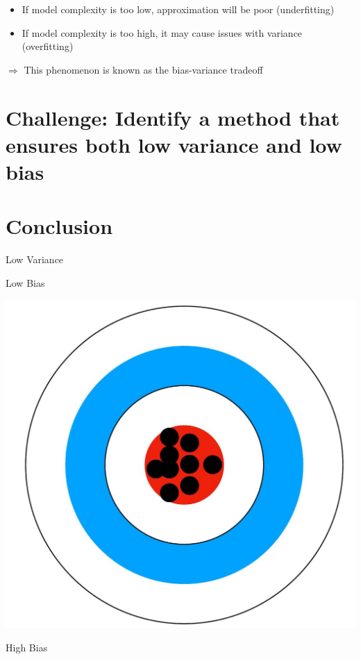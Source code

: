 \documentclass[10pt]{article}
\begin{document}
\begin{itemize}
  \item If model complexity is too low, approximation will be poor (underfitting)

  \item If model complexity is too high, it may cause issues with variance (overfitting)

\end{itemize}

$\Rightarrow$ This phenomenon is known as the bias-variance tradeoff

\section*{Challenge: Identify a method that ensures both low variance and low bias}
\section*{Conclusion}
Low Variance

Low Bias

\begin{center}
\includegraphics[max width=\textwidth]{2023_12_30_442f876157646883c2c9g-29(1)}
\end{center}

High Bias
\end{document}
